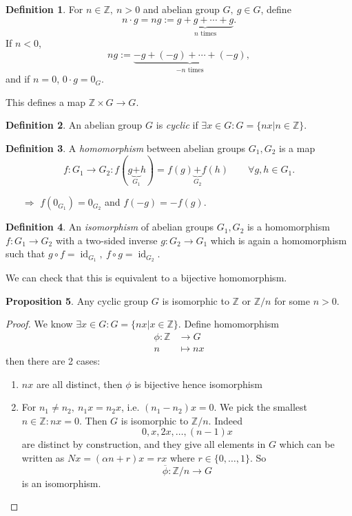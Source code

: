 \documentclass[a4paper]{article}
\newcommand{\id}{\operatorname{id}}
\theoremstyle{definition}
\newtheorem{defn}{Definition}[subsection]
\newtheorem{prop}[defn]{Proposition}
\begin{document}
\begin{defn}
For $n\in \mathbb Z,\ n>0$ and abelian group $G,\ g\in G$, define
\[
n\cdot g = ng := \underbrace{g+g+\cdots+g}_{n\text{ times}} .
\]
If $n<0$,
\[
ng := \underbrace{-g+(-g)+\cdots+(-g)}_{-n\text{ times}} ,
\]
and if $n=0$, $0\cdot g = 0_G.$
\end{defn}
This defines a map $\mathbb Z \times G \rightarrow G.$
\begin{defn}
An abelian group $G$ is \textit{cyclic} if $\exists x\in G:G=\{nx | n\in \mathbb Z\} .$
\end{defn}
\begin{defn}
A \textit{homomorphism} between abelian groups $G_1,G_2$ is a map
\[
f:G_1\rightarrow G_2:f(g\underbrace{+}_{G_1}h)=f(g)\underbrace{+}_{G_2}f(h) \qquad \forall g,h\in G_1 .
\]
\begin{itemize}
    \item[$\Rightarrow$] $f\left(0_{G_1}\right)=0_{G_2}$ and $f(-g) = -f(g).$
\end{itemize}
\end{defn}
\begin{defn}
An \textit{isomorphism} of abelian groups $G_1,G_2$ is a homomorphism $f:G_1\rightarrow G_2$ with a two-sided inverse $g:G_2\rightarrow G_1$ which is again a homomorphism such that $g\circ f = \id_{G_1},\ f\circ g = \id_{G_2}$.
\end{defn}
We can check that this is equivalent to a bijective homomorphism.
\begin{prop}
Any cyclic group $G$ is isomorphic to $\mathbb Z$ or $\mathbb Z/n$ for some $n>0.$
\end{prop}
\begin{proof}
We know $\exists x\in G : G=\{n x|x\in \mathbb Z\}$. Define homomorphism
\[
\begin{aligned}
\phi:\mathbb Z &\rightarrow G \\
n &\mapsto nx
\end{aligned}
\]
then there are 2 cases:
\begin{enumerate}
    \item $nx$ are all distinct, then $\phi$ is bijective hence isomorphism
    \item For $n_1\neq n_2,\ n_1 x=n_2 x$, i.e. $(n_1-n_2)x=0$. We pick the smallest $n\in \mathbb Z:n x=0.$ Then $G$ is isomorphic to $\mathbb Z/n$. Indeed
    \[
    0,x,2x,\ldots,(n-1)x
    \]
    are distinct by construction, and they give all elements in $G$ which can be written as $Nx=(\alpha n+r)x=rx$ where $r\in \{0,\ldots,1\}.$ So
    \[
    \overline{\phi}:\mathbb Z/n \rightarrow G
    \]
    is an isomorphism.
\end{enumerate}
\end{proof}
\end{document}
